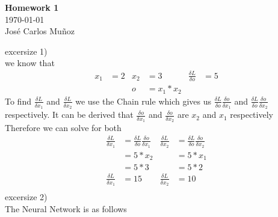 \documentclass[12pt,english]{article}
\begin{document}
\begin{center}
    \Large
    \textbf{Homework 1}\\
    \small
    \today\\
    \large
    Jos\'{e} Carlos Mu\~{n}oz
\end{center}
excersize 1)\\
we know that
\begin{align*}
x_1&=2 & x_2&= 3 & \frac{\delta L}{\delta o}&=5\\
     &     & o   &= x_1 * x_2 
\end{align*}
To find $\frac{\delta L}{\delta x_1}$ and $\frac{\delta L}{\delta x_2}$ we use the Chain rule which gives us $\frac{\delta L}{\delta o}\frac{\delta o}{\delta x_1}$ and $\frac{\delta L}{\delta o}\frac{\delta o}{\delta x_2}$ respectively. It can be derived that $\frac{\delta o}{\delta x_1}$ and $\frac{\delta o}{\delta x_2}$ are $x_2$ and $x_1$ respectively\\
Therefore we can solve for both\\
\begin{align*}
\frac{\delta L}{\delta x_1}&=\frac{\delta L}{\delta o}\frac{\delta o}{\delta x_1} & \frac{\delta L}{\delta x_2}&=\frac{\delta L}{\delta o}\frac{\delta o}{\delta x_2}\\
                                      &=5*x_2  &  &=5 *x_1\\
                                      &=5*3  &  &=5 *2\\
\frac{\delta L}{\delta x_1}&=15  &  \frac{\delta L}{\delta x_2}&=10\\
\end{align*}
excersize 2)\\
The Neural Network is as follows
\end{document}
